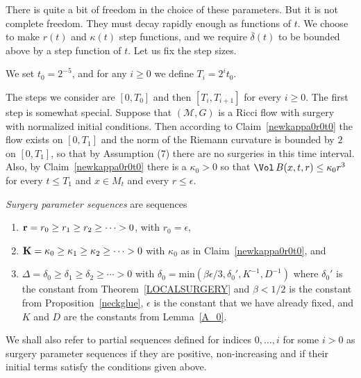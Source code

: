 There is quite a bit of freedom in the choice of these parameters.
But it is not complete freedom. They must decay rapidly enough as
functions of $t$. We choose to make $r(t)$ and $\kappa(t)$  step
functions, and we require $\overline\delta(t)$ to be bounded above
by a step function of $t$. Let us fix the step sizes.


\begin{definition}[Time steps T_i = 2^i t_0]
\label{def:time-steps-T-i}
We set $t_0=2^{-5}$, and for any $i\ge 0$ we define $T_i=2^it_0$.
\end{definition}

The steps we consider are $[0,T_0]$ and then $[T_i,T_{i+1}]$ for
every $i\ge 0$. The first step  is somewhat special. Suppose that
$({\mathcal M},G)$ is a Ricci flow with surgery with normalized
initial conditions. Then
 according to
Claim~\ref{newkappa0r0t0} the flow exists on $[0,T_1]$ and the norm
of the Riemann curvature is bounded by $2$ on $[0,T_1]$, so that
by Assumption (7) there are no surgeries in this time interval. Also,
by Claim~\ref{newkappa0r0t0} there is a $\kappa_0>0$ so
that $\Vol\,B(x,t,r)\le \kappa_0r^3$ for every $t\le T_1$ and
$x\in M_t$ and every $r\le \epsilon$.

\begin{definition}
\label{def:surgery-parameter-sequences}
\label{surgeryparams}
{\em Surgery parameter sequences} are sequences
\begin{enumerate}
\item[(i)] ${\bf r}=r_0\ge r_1\ge r_2\ge \cdots >0$, with $r_0=\epsilon$,
\item[(ii)] ${\bf K}=\kappa_0\ge \kappa_1\ge \kappa_2\ge \cdots >0$
with $\kappa_0$ as in Claim~\ref{newkappa0r0t0}, and \item[(iii)] $
\Delta=\delta_0\ge \delta_1\ge \delta_2\ge \cdots
>0$ with $\delta_0=\mathrm{min}(\beta\epsilon/3,\delta_0',K^{-1},D^{-1})$
 where $\delta_0'$ is the constant
from Theorem~\ref{LOCALSURGERY} and $\beta<1/2$ is the constant from
Proposition~\ref{neckglue}, $\epsilon$ is the constant that we have
already fixed, and $K$ and $D$ are the constants from
Lemma~\ref{A_0}.
\end{enumerate}
We shall also refer to partial sequences defined for indices $0,\ldots, i$ for some $i>0$
as surgery parameter sequences if they are positive, non-increasing and if their initial
terms satisfy the conditions given above.
\end{definition}


